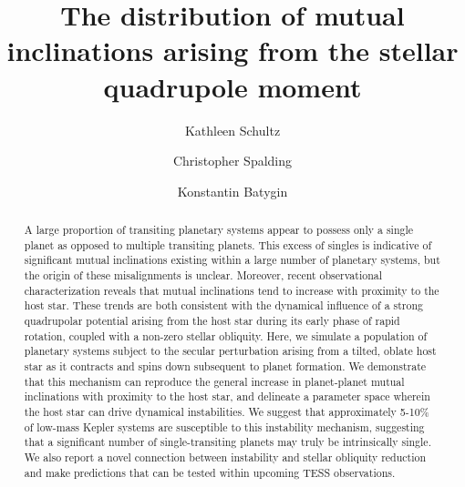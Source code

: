 \documentclass[twocolumn]{aastex63}
\begin{document}
 

\title{The distribution of mutual inclinations arising from the stellar quadrupole moment}

\author{Kathleen Schultz }


\author{Christopher Spalding}


\author{Konstantin Batygin}




\begin{abstract}
A large proportion of transiting planetary systems appear to possess only a single planet as opposed to multiple transiting planets. This excess of singles is indicative of significant mutual inclinations existing within a large number of planetary systems, but the origin of these misalignments is unclear. Moreover, recent observational characterization reveals that mutual inclinations tend to increase with proximity to the host star. These trends are both consistent with the dynamical influence of a strong quadrupolar potential arising from the host star during its early phase of rapid rotation, coupled with a non-zero stellar obliquity. Here, we simulate a population of planetary systems subject to the secular perturbation arising from a tilted, oblate host star as it contracts and spins down subsequent to planet formation. We demonstrate that this mechanism can reproduce the general increase in planet-planet mutual inclinations with proximity to the host star, and delineate a parameter space wherein the host star can drive dynamical instabilities. We suggest that approximately 5-10\% of low-mass Kepler systems are susceptible to this instability mechanism, suggesting that a significant number of single-transiting planets may truly be intrinsically single. We also report a novel connection between instability and stellar obliquity reduction and make predictions that can be tested within upcoming TESS observations.
\end{abstract}

\end{document}
